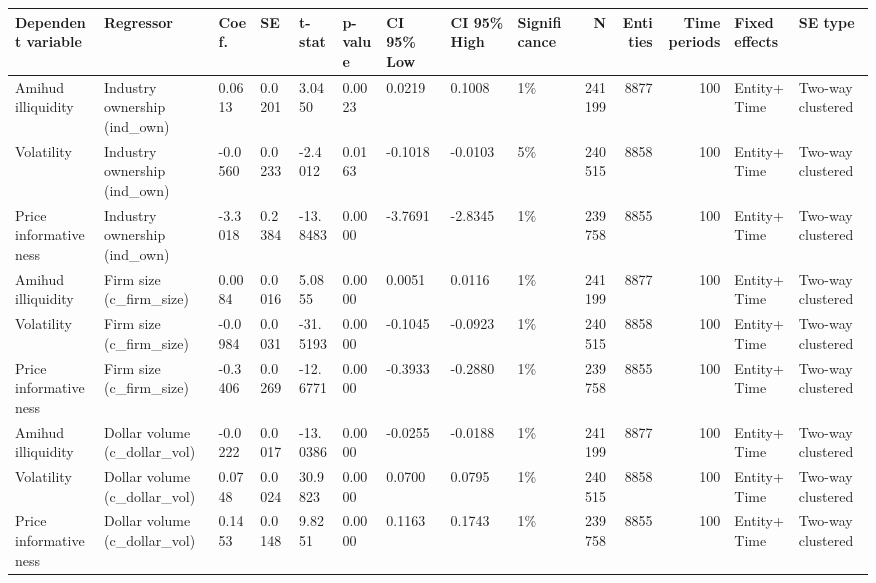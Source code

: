 \begin{tabular}{lllllllllrrrll}
\toprule
Dependent variable & Regressor & Coef. & SE & t-stat & p-value & CI 95\% Low & CI 95\% High & Significance & N & Entities & Time periods & Fixed effects & SE type \\
\midrule
Amihud illiquidity & Industry ownership (ind\_own) & 0.0613 & 0.0201 & 3.0450 & 0.0023 & 0.0219 & 0.1008 & 1\% & 241199 & 8877 & 100 & Entity+Time & Two-way clustered \\
Volatility & Industry ownership (ind\_own) & -0.0560 & 0.0233 & -2.4012 & 0.0163 & -0.1018 & -0.0103 & 5\% & 240515 & 8858 & 100 & Entity+Time & Two-way clustered \\
Price informativeness & Industry ownership (ind\_own) & -3.3018 & 0.2384 & -13.8483 & 0.0000 & -3.7691 & -2.8345 & 1\% & 239758 & 8855 & 100 & Entity+Time & Two-way clustered \\
Amihud illiquidity & Firm size (c\_firm\_size) & 0.0084 & 0.0016 & 5.0855 & 0.0000 & 0.0051 & 0.0116 & 1\% & 241199 & 8877 & 100 & Entity+Time & Two-way clustered \\
Volatility & Firm size (c\_firm\_size) & -0.0984 & 0.0031 & -31.5193 & 0.0000 & -0.1045 & -0.0923 & 1\% & 240515 & 8858 & 100 & Entity+Time & Two-way clustered \\
Price informativeness & Firm size (c\_firm\_size) & -0.3406 & 0.0269 & -12.6771 & 0.0000 & -0.3933 & -0.2880 & 1\% & 239758 & 8855 & 100 & Entity+Time & Two-way clustered \\
Amihud illiquidity & Dollar volume (c\_dollar\_vol) & -0.0222 & 0.0017 & -13.0386 & 0.0000 & -0.0255 & -0.0188 & 1\% & 241199 & 8877 & 100 & Entity+Time & Two-way clustered \\
Volatility & Dollar volume (c\_dollar\_vol) & 0.0748 & 0.0024 & 30.9823 & 0.0000 & 0.0700 & 0.0795 & 1\% & 240515 & 8858 & 100 & Entity+Time & Two-way clustered \\
Price informativeness & Dollar volume (c\_dollar\_vol) & 0.1453 & 0.0148 & 9.8251 & 0.0000 & 0.1163 & 0.1743 & 1\% & 239758 & 8855 & 100 & Entity+Time & Two-way clustered \\
\bottomrule
\end{tabular}
